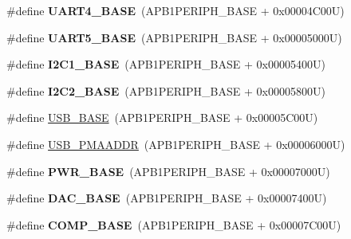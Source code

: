 \begin{DoxyCompactItemize}
\item 
\hypertarget{group___peripheral__memory__map_ga94d92270bf587ccdc3a37a5bb5d20467}{\#define {\bfseries U\-A\-R\-T4\-\_\-\-B\-A\-S\-E}~(A\-P\-B1\-P\-E\-R\-I\-P\-H\-\_\-\-B\-A\-S\-E + 0x00004\-C00\-U)}\label{group___peripheral__memory__map_ga94d92270bf587ccdc3a37a5bb5d20467}

\item 
\hypertarget{group___peripheral__memory__map_gaa155689c0e206e6994951dc3cf31052a}{\#define {\bfseries U\-A\-R\-T5\-\_\-\-B\-A\-S\-E}~(A\-P\-B1\-P\-E\-R\-I\-P\-H\-\_\-\-B\-A\-S\-E + 0x00005000\-U)}\label{group___peripheral__memory__map_gaa155689c0e206e6994951dc3cf31052a}

\item 
\hypertarget{group___peripheral__memory__map_gacd72dbffb1738ca87c838545c4eb85a3}{\#define {\bfseries I2\-C1\-\_\-\-B\-A\-S\-E}~(A\-P\-B1\-P\-E\-R\-I\-P\-H\-\_\-\-B\-A\-S\-E + 0x00005400\-U)}\label{group___peripheral__memory__map_gacd72dbffb1738ca87c838545c4eb85a3}

\item 
\hypertarget{group___peripheral__memory__map_ga04bda70f25c795fb79f163b633ad4a5d}{\#define {\bfseries I2\-C2\-\_\-\-B\-A\-S\-E}~(A\-P\-B1\-P\-E\-R\-I\-P\-H\-\_\-\-B\-A\-S\-E + 0x00005800\-U)}\label{group___peripheral__memory__map_ga04bda70f25c795fb79f163b633ad4a5d}

\item 
\#define \hyperlink{group___peripheral__memory__map_gaa6c4cbed4ddbb3ecd77de93fab2a2e04}{U\-S\-B\-\_\-\-B\-A\-S\-E}~(A\-P\-B1\-P\-E\-R\-I\-P\-H\-\_\-\-B\-A\-S\-E + 0x00005\-C00\-U)
\item 
\#define \hyperlink{group___peripheral__memory__map_gaf992dfdd5707568c5cb5506e2347e808}{U\-S\-B\-\_\-\-P\-M\-A\-A\-D\-D\-R}~(A\-P\-B1\-P\-E\-R\-I\-P\-H\-\_\-\-B\-A\-S\-E + 0x00006000\-U)
\item 
\hypertarget{group___peripheral__memory__map_gac691ec23dace8b7a649a25acb110217a}{\#define {\bfseries P\-W\-R\-\_\-\-B\-A\-S\-E}~(A\-P\-B1\-P\-E\-R\-I\-P\-H\-\_\-\-B\-A\-S\-E + 0x00007000\-U)}\label{group___peripheral__memory__map_gac691ec23dace8b7a649a25acb110217a}

\item 
\hypertarget{group___peripheral__memory__map_gad18d0b914c7f68cecbee1a2d23a67d38}{\#define {\bfseries D\-A\-C\-\_\-\-B\-A\-S\-E}~(A\-P\-B1\-P\-E\-R\-I\-P\-H\-\_\-\-B\-A\-S\-E + 0x00007400\-U)}\label{group___peripheral__memory__map_gad18d0b914c7f68cecbee1a2d23a67d38}

\item 
\hypertarget{group___peripheral__memory__map_gaa9f5d2999c6918e385d7a526c4f6b1d3}{\#define {\bfseries C\-O\-M\-P\-\_\-\-B\-A\-S\-E}~(A\-P\-B1\-P\-E\-R\-I\-P\-H\-\_\-\-B\-A\-S\-E + 0x00007\-C00\-U)}\label{group___peripheral__memory__map_gaa9f5d2999c6918e385d7a526c4f6b1d3}


\end{DoxyCompactItemize}
